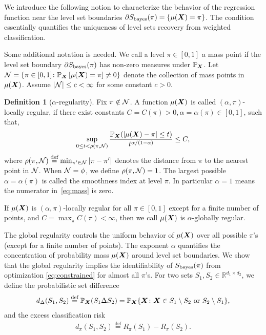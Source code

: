 \documentclass[11pt]{article}
\theoremstyle{plain}
\theoremstyle{definition}
\newtheorem{defn}{Definition}
\def\bayesS{S_{\textup{bayes}}}
\begin{document}
We introduce the following notion to characterize the behavior of the regression function near the level set boundaries $\partial S_{\text{bayes}}(\pi) = \{ \mu(\bm X)= \pi\}$. The condition essentially quantifies the uniqueness of level sets recovery from weighted classification.

Some additional notation is needed. We call a level $\pi\in[0,1]$ a mass point if the level set boundary $\partial \bayesS(\pi)$ has non-zero measures under $\mathbb{P}_{\bm X}$. Let $\mathcal{N}=\{\pi\in[0,1] \colon \mathbb{P}_{\bm X}\left[\mu(\bm X)=\pi\right]\neq 0\}$ denote the collection of mass points in $\mu(\bm X)$. Assume $|\mathcal{N}|\leq c<\infty$ for some constant $c>0$. 

\begin{defn} [$\alpha$-regularity]\label{ass:decboundary} Fix $\pi \notin \mathcal{N}$. A function $\mu(\bm X)$ is called $(\alpha,\pi)$-locally regular, if there exist constants $C=C(\pi)>0, \alpha=\alpha(\pi)\in[0,1]$, such that,
\begin{equation}\label{eq:mass}
\sup_{0\leq t<\rho(\pi, \mathcal{N})}{\mathbb{P}_{\bm X}(|\mu(\bm X)-\pi|\leq t)\over t^{\alpha/(1-\alpha)}}\leq C,
\end{equation}
where $\rho(\pi,\mathcal{N})\stackrel{\text{def}}{=}\min_{\pi'\in \mathcal{N}} |\pi-\pi'|$ denotes the distance from $\pi$ to the nearest point in $\mathcal{N}$.  When $\mathcal{N} = \phi$, we define $\rho(\pi,\mathcal{N})=1$. The largest possible $\alpha=\alpha(\pi)$ is called the smoothness index at level $\pi$. In particular $\alpha=1$ means the numerator in~\eqref{eq:mass} is zero. 

If $\mu(\bm X)$ is $(\alpha,\pi)$-locally regular for all $\pi \in [0,1]$ except for a finite number of points, and $C=\max_{\pi} C(\pi)<\infty$, then we call $\mu(\bm X)$ is $\alpha$-globally regular. 
\end{defn}

The global regularity controls the uniform behavior of $\mu(\bm X)$ over all possible $\pi$'s (except for a finite number of points). The exponent $\alpha$ quantifies the concentration of probability mass $\mu(\bm X)$ around level set boundaries. We show that the global regularity implies the identifiability of $\bayesS(\pi)$ from optimization \eqref{eq:constrained} for almost all $\pi$'s. For two sets $S_1, S_2 \in \mathbb{R}^{d_1\times d_2}$, we define the probabilistic set difference 
\begin{align}\label{eq:riskdiff}
d_{\Delta}(S_1,S_2)\stackrel{\text{def}}{=}\mathbb{P}_{\bm X}(S_1\Delta S_2)=\mathbb{P}_{\bm X}\{\bm X\colon \bm X\in S_1\setminus S_2 \text{ or }S_2\setminus S_1\},
\end{align}
and the excess classification risk
\begin{align}\label{eq:setdiff}
d_\pi(S_1,S_2)\stackrel{\text{def}}{=} R_{\pi}(S_1)-R_{\pi}(S_2).
\end{align}
\end{document}

